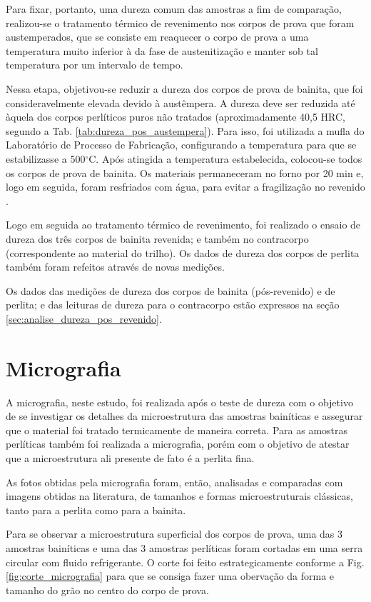 \documentclass[
12pt,
openany, %
oneside, %
a4paper,			
english,			
brazil			        %
]{abntbibufjf}
\begin{document}
	Para fixar, portanto, uma dureza comum das amostras a fim de comparação, realizou-se o tratamento térmico de revenimento nos corpos de prova que foram austemperados, que se consiste em reaquecer o corpo de prova a uma temperatura muito inferior à da fase de austenitização e manter sob tal temperatura por um intervalo de tempo.

	Nessa etapa, objetivou-se reduzir a dureza dos corpos de prova de bainita, que foi consideravelmente elevada devido à austêmpera. A dureza deve ser reduzida até àquela dos corpos perlíticos puros não tratados (aproximadamente 40,5 HRC, segundo a Tab. \ref{tab:dureza_pos_austempera}). Para isso, foi utilizada a mufla do Laboratório de Processo de Fabricação, configurando a temperatura para que se estabilizasse a 500$^\circ$C. Após atingida a temperatura estabelecida, colocou-se todos os corpos de prova de bainita. Os materiais permaneceram no forno por 20 min e, logo em seguida, foram resfriados com água, para evitar a fragilização no revenido \cite{silva2006acos}.

	Logo em seguida ao tratamento térmico de revenimento, foi realizado o ensaio de dureza dos três corpos de bainita revenida; e também no contracorpo (correspondente ao material do trilho). Os dados de dureza dos corpos de perlita também foram refeitos através de novas medições.
	
	Os dados das medições de dureza dos corpos de bainita (pós-revenido) e de perlita; e das leituras de dureza para o contracorpo estão expressos na seção \ref{sec:analise_dureza_pos_revenido}.

\section{Micrografia}	

	A micrografia, neste estudo, foi realizada após o teste de dureza com o objetivo de se investigar os detalhes da microestrutura das amostras bainíticas e assegurar que o material foi tratado termicamente de maneira correta. Para as amostras perlíticas também foi realizada a micrografia, porém com o objetivo de atestar que a microestrutura ali presente de fato é a perlita fina.

	As fotos obtidas pela micrografia foram, então, analisadas e comparadas com imagens obtidas na literatura, de tamanhos e formas microestruturais clássicas, tanto para a perlita como para a bainita.

	Para se observar a microestrutura superficial dos corpos de prova, uma das 3 amostras bainíticas e uma das 3 amostras perlíticas foram cortadas em uma serra circular com fluido refrigerante. O corte foi feito estrategicamente conforme a Fig. \ref{fig:corte_micrografia}  para que se consiga fazer uma obervação da forma e tamanho do grão no centro do corpo de prova.
\end{document}
